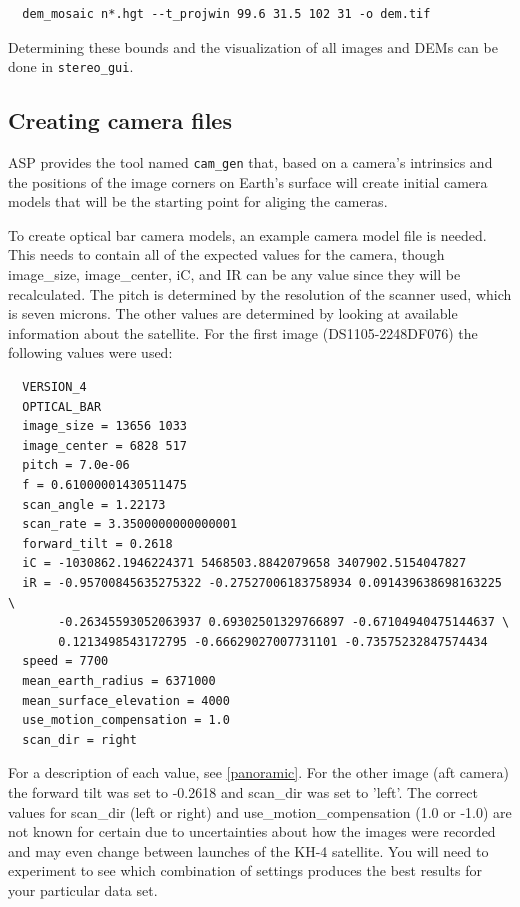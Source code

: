 \begin{verbatim}
  dem_mosaic n*.hgt --t_projwin 99.6 31.5 102 31 -o dem.tif
\end{verbatim}

Determining these bounds and the visualization of all images and DEMs
can be done in \texttt{stereo\_gui}.

\subsection{Creating camera files}

ASP provides the tool named \texttt{cam\_gen} that, based on a camera's intrinsics
and the positions of the image corners on Earth's surface will
create initial camera models that will be the starting point for aliging the cameras.

To create optical bar camera models, an example camera model file is needed.
This needs to contain all of the expected values for the camera, though
image\_size, image\_center, iC, and IR can be any value since they will be recalculated.
The pitch is determined by the resolution of the scanner used, which is seven microns.
The other values are determined by looking at available information about the satellite.
For the first image (DS1105-2248DF076) the following values were used:

\begin{verbatim}
  VERSION_4
  OPTICAL_BAR
  image_size = 13656 1033
  image_center = 6828 517
  pitch = 7.0e-06
  f = 0.61000001430511475
  scan_angle = 1.22173
  scan_rate = 3.3500000000000001
  forward_tilt = 0.2618
  iC = -1030862.1946224371 5468503.8842079658 3407902.5154047827
  iR = -0.95700845635275322 -0.27527006183758934 0.091439638698163225 \
       -0.26345593052063937 0.69302501329766897 -0.67104940475144637 \
       0.1213498543172795 -0.66629027007731101 -0.73575232847574434
  speed = 7700
  mean_earth_radius = 6371000
  mean_surface_elevation = 4000
  use_motion_compensation = 1.0
  scan_dir = right
\end{verbatim}

For a description of each value, see \ref{panoramic}.
For the other image (aft camera) the forward tilt was set to -0.2618 and scan\_dir was set to 'left'.
The correct values for scan\_dir (left or right) and use\_motion\_compensation (1.0 or -1.0) are not
known for certain due to uncertainties about how the images were recorded and may even change
between launches of the KH-4 satellite.  You will need to experiment to see which combination of settings
produces the best results for your particular data set.

